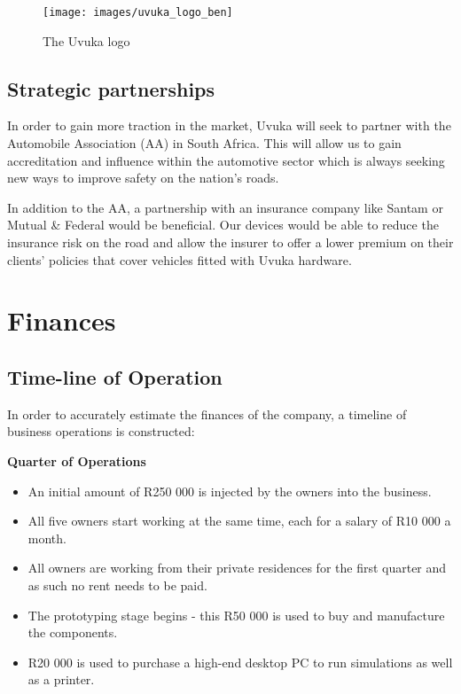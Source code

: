 \begin{figure}[H]
\centering
\texttt{[image: images/uvuka\_logo\_ben]}
\vskip10pt
\caption[The Uvuka logo]{The Uvuka logo}
\label{fig:uvuka_logo}
\end{figure}

\section{Strategic partnerships}
In order to gain more traction in the market, Uvuka will seek to partner with the Automobile Association (AA) in South Africa. This will allow us to gain accreditation and influence within the automotive sector which is always seeking new ways to improve safety on the nation's roads.

In addition to the AA, a partnership with an insurance company like Santam or Mutual \& Federal would be beneficial. Our devices would be able to reduce the insurance risk on the road and allow the insurer to offer a lower premium on their clients' policies that cover vehicles fitted with Uvuka hardware.

\newpage

\chapter{Finances}

\section{Time-line of Operation}
In order to accurately estimate the finances of the company, a timeline of business operations is constructed:

{\bfseries {} Quarter of Operations}
\begin{itemize}
\item An initial amount of R250 000 is injected by the owners into the business.
\item All five owners start working at the same time, each for a salary of R10 000 a month.
\item All owners are working from their private residences for the first quarter and as such no rent needs to be paid.
\item The prototyping stage begins - this R50 000 is used to buy and manufacture the components.
\item R20 000 is used to purchase a high-end desktop PC to run simulations as well as a printer.
\end{itemize}

